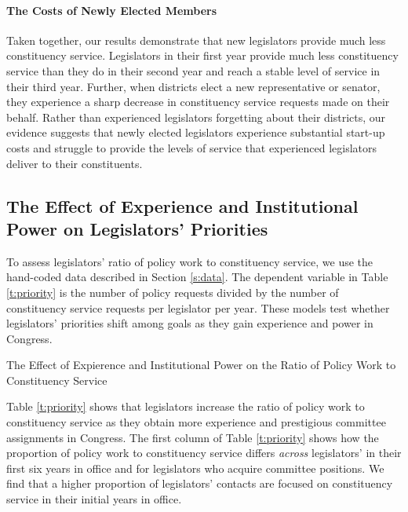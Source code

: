 \documentclass[12pt]{article}
\begin{document}
\paragraph{The Costs of Newly Elected Members} Taken together, our results demonstrate that new legislators provide much less constituency service. Legislators in their first year provide much less constituency service than they do in their second year and reach a stable level of service in their third year. Further, when districts elect a new representative or senator, they experience a sharp decrease in constituency service requests made on their behalf. Rather than experienced legislators forgetting about their districts, our evidence suggests that newly elected legislators experience substantial start-up costs and struggle to provide the levels of service that experienced legislators deliver to their constituents.  


\subsection{The Effect of Experience and Institutional Power on Legislators' Priorities}\label{s:priority} 
To assess legislators' ratio of policy work to constituency service, we use the hand-coded data described in Section \ref{s:data}. The dependent variable in Table \ref{t:priority} is the number of policy requests divided by the number of constituency service requests per legislator per year. These models test whether legislators' priorities shift among goals as they gain experience and power in Congress.

\begin{table}
\begin{center}
\begin{minipage}{\textwidth}
\caption{The Effect of Expierence and Institutional Power on the Ratio of Policy Work to Constituency Service} \label{t:priority}
\centering

\end{minipage}
\end{center}
\end{table}


Table \ref{t:priority} shows that legislators increase the ratio of policy work to constituency service as they obtain more experience and prestigious committee assignments in Congress. The first column of Table \ref{t:priority} shows how the proportion of policy work to constituency service differs \textit{across} legislators' in their first six years in office and for legislators who acquire committee positions. We find that a higher proportion of legislators' contacts are focused on constituency service in their initial years in office.
\end{document}
